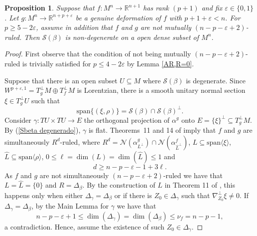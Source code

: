\documentclass{article}
\newtheorem{prop}[thm]{Proposition}
\theoremstyle{remark}
\begin{document}
\begin{prop}\label{S(beta) definido si no es reglada}
    Suppose that $f:M^n\rightarrow\mathbb{R}^{n+1}$ has rank $(p+1)$ and fix $\varepsilon\in\{0,1\}$. Let $g:M^n\rightarrow\mathbb{R}^{n+p+\varepsilon}$ be a genuine deformation of $f$ with $p+1+\varepsilon<n$. For $p\geq 5-2\varepsilon$, assume in addition that $f$ and $g$ are not mutually $ (n-p-\varepsilon+2)$-ruled. Then $\mathcal{S}(\beta)$ is non-degenerate on a open dense subset of $M^n$.
\end{prop}

\begin{proof}
    First observe that the condition of not being mutually $(n-p-\varepsilon+2)$-ruled is trivially satisfied for $p\leq 4-2\varepsilon$ by Lemma \ref{AR,R=0}.

    Suppose that there is an open subset $U\subseteq M$ where $\mathcal{S}(\beta)$ is degenerate. Since $W^{p+\varepsilon,1}=T^\perp_gM\oplus T^\perp_fM$ is Lorentzian, there is a smooth unitary normal section $\xi\in T^\perp_gU$ such that
    \begin{equation}\label{Sbeta degenerado}
        \text{span}\{(\xi,\rho)\}=\mathcal{S}(\beta)\cap\mathcal{S}(\beta)^\perp. 
    \end{equation}
    Consider $\gamma:TU\times TU\rightarrow E$ the orthogonal projection of $\alpha^g$ onto $E=\{\xi\}^\perp\subseteq T^\perp_g M$. By (\ref{Sbeta degenerado}), $\gamma$ is flat. Theorems~11 and 14 of \cite{DF3} imply that $f$ and $g$ are simultaneously $R^d$-ruled, where $R^d=\mathcal{N}(\alpha^g_{L^\perp})\cap\mathcal{N}(\alpha^f_{\hat{L}^\perp})$, $L\subseteq\text{span}\langle\xi\rangle$, $\hat{L}\subseteq\text{span}\langle\rho\rangle$, $0\leq\ell=\dim(L)=\dim(\hat{L})\leq 1$ and 
    \begin{equation}\label{cota para el d}
        d\geq n-p-\varepsilon-1+3\ell.
    \end{equation}
    As $f$ and $g$ are not simultaneously $(n-p-\varepsilon+2)$-ruled we have that $L=\hat{L}=\{0\}$ and $R=\Delta_\beta$. By the construction of $L$ in Theorem 11 of \cite{DF3}, this happens only when either $\Delta_\gamma=\Delta_\beta$ or if there is $Z_0\in\Delta_\gamma$ such that $\nabla_{Z_0}^\perp\xi\neq 0$. If $\Delta_\gamma=\Delta_\beta$, by the Main Lemma for $\gamma$ we have that
    $$n-p-\varepsilon+1\leq\dim(\Delta_\gamma)=\dim(\Delta_\beta)\leq \nu_f=n-p-1,$$
    a contradiction. Hence, assume the existence of such $Z_0\in\Delta_\gamma$. 
    

\end{proof}
\end{document}
